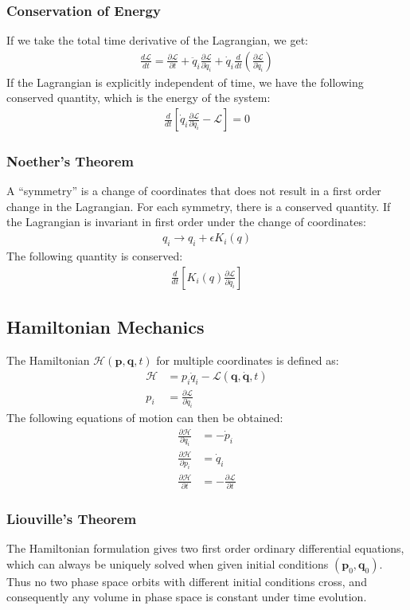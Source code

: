 \documentclass[a4paper]{article}
\newcommand{\Lagr}{\mathcal{L}}	       %
\newcommand{\Hami}{\mathcal{H}}	       %
\newcommand{\ve}[1]{
  \ensuremath{\bm{#1}}}	               %
\newcommand{\pd}[2]{
  \ensuremath{
    \frac{\partial #1}{\partial #2} }} %
\begin{document}
\begin{multicols*}{2}
\subsubsection{Conservation of Energy}
If we take the total time derivative of the Lagrangian, we get:
\begin{align*}
  \frac{d\Lagr}{dt} = \pd{\Lagr}{t} + \ddot{q}_i\pd{\Lagr}{\dot{q}_i} +
  \dot{q}_i \frac{d}{dt} \left( \pd{\Lagr}{\dot{q}_i} \right)
\end{align*}
If the Lagrangian is explicitly independent of time, we have the following conserved quantity, which is the energy of the system:
\begin{align*}
  \frac{d}{dt} \left[ \dot{q}_i \pd{\Lagr}{\dot{q}_i} - \Lagr \right] = 0
\end{align*}
\subsubsection{Noether's Theorem}
A ``symmetry'' is a change of coordinates that does not result in a first order
change in the Lagrangian. For each symmetry, there is a conserved quantity. If
the Lagrangian is invariant in first order under the change of coordinates:
\begin{align*}
  q_i \rightarrow q_i + \epsilon K_i (q)
\end{align*}
The following quantity is conserved:
\begin{align*}
  \frac{d}{dt} \left[ K_i(q) \pd{\Lagr}{\dot{q_i}} \right]
\end{align*}
\subsection{Hamiltonian Mechanics}
The Hamiltonian $\Hami(\ve{p},\ve{q},t)$ for multiple coordinates is defined as:
\begin{align*}
  \Hami &= p_i \dot{q}_i - \Lagr(\ve{q}, \dot{\ve{q}}, t) \\
  p_i &= \pd{\Lagr}{\dot{q}_i}
\end{align*}
The following equations of motion can then be obtained:
\begin{align*}
  \pd{\Hami}{q_i} &= -\dot{p}_i \\
  \pd{\Hami}{p_i} &= \dot{q}_i \\
  \pd{\Hami}{t} &= - \pd{\Lagr}{t}
\end{align*}
\subsubsection{Liouville's Theorem}
The Hamiltonian formulation gives two first order ordinary differential
equations, which can always be uniquely solved when given initial conditions
$(\ve{p}_0, \ve{q}_0)$. Thus no two phase space orbits with different initial
conditions cross, and consequently any volume in phase space is constant under
time evolution.

\end{multicols*}
\end{document}
